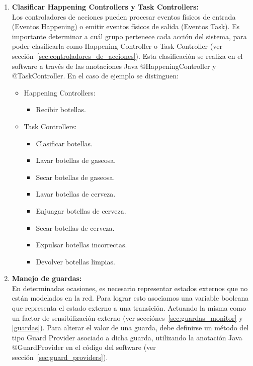 \begin{enumerate}
\item \textbf{Clasificar Happening Controllers y Task Controllers:}\\
            Los controladores de acciones pueden procesar eventos físicos de entrada
            (Eventos Happening) o emitir eventos físicos de salida (Eventos Task). Es
            importante determinar a cuál grupo pertenece cada acción del
            sistema, para poder clasificarla como Happening Controller o Task Controller (ver
            sección~\ref{sec:controladores_de_acciones}).
            Esta clasificación se realiza en el software a través de las anotaciones Java
            @HappeningController y @TaskController. En el caso de ejemplo se distinguen:
            \begin{itemize}
              \item Happening Controllers:
                  \begin{itemize}
                    \item Recibir botellas.
                  \end{itemize}
              \item Task Controllers:
                  \begin{itemize}
                  \item Clasificar botellas.
                  \item Lavar botellas de gaseosa.
                  \item Secar botellas de gaseosa.
                  \item Lavar botellas de cerveza.
                  \item Enjuagar botellas de cerveza.
                  \item Secar botellas de cerveza.
                  \item Expulsar botellas incorrectas.
                  \item Devolver botellas limpias.
                  \end{itemize}
            \end{itemize}

\item \textbf{Manejo de guardas:}\\
            En determinadas ocasiones, es necesario representar
            estados externos que no están modelados en la red. Para lograr esto asociamos
            una variable booleana que representa el estado externo a una transición.
            Actuando la misma como un factor de sensibilización externo (ver
            secciónes~\ref{sec:guardas_monitor} y \ref{guardas}).
            Para alterar el valor de una guarda, debe definirse un método del tipo Guard Provider
            asociado a dicha guarda, utilizando la anotación Java @GuardProvider en el
            código del software (ver sección~\ref{sec:guard_providers}).
    

\end{enumerate}
